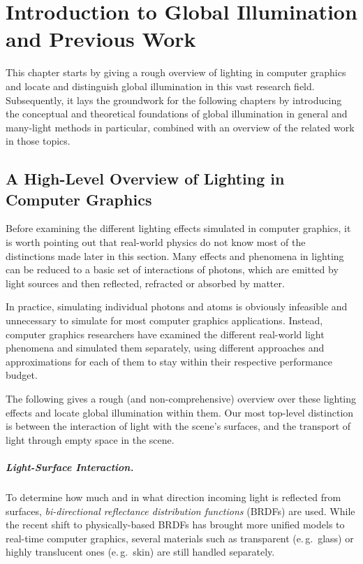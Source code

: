 
\chapter{Introduction to Global Illumination and Previous Work}
\label{chap:introductionGI}

This chapter starts by giving a rough overview of lighting in computer graphics and locate and distinguish global illumination in this vast research field.
Subsequently, it lays the groundwork for the following chapters by introducing the conceptual and theoretical foundations of global illumination in general and many-light methods in particular, combined with an overview of the related work in those topics.


\section{A High-Level Overview of Lighting in Computer Graphics}

Before examining the different lighting effects simulated in computer graphics, it is worth pointing out that real-world physics do not know most of the distinctions made later in this section. Many effects and phenomena in lighting can be reduced to a basic set of interactions of photons, which are emitted by light sources and then reflected, refracted or absorbed by matter.

In practice, simulating individual photons and atoms is obviously infeasible and unnecessary to simulate for most computer graphics applications. Instead, computer graphics researchers have examined the different real-world light phenomena and simulated them separately, using different approaches and approximations for each of them to stay within their respective performance budget.


The following gives a rough (and non-comprehensive) overview over these lighting effects and locate global illumination within them. Our most top-level distinction is between the interaction of light with the scene's surfaces, and the transport of light through empty space in the scene.

\paragraph{Light-Surface Interaction.}

To determine how much and in what direction incoming light is reflected from surfaces, \textit{bi-directional reflectance distribution functions} (BRDFs) are used. While the recent shift to physically-based BRDFs has brought more unified models to real-time computer graphics, several materials such as transparent (e.\,g.\ glass) or highly translucent ones (e.\,g.\ skin) are still handled separately.


